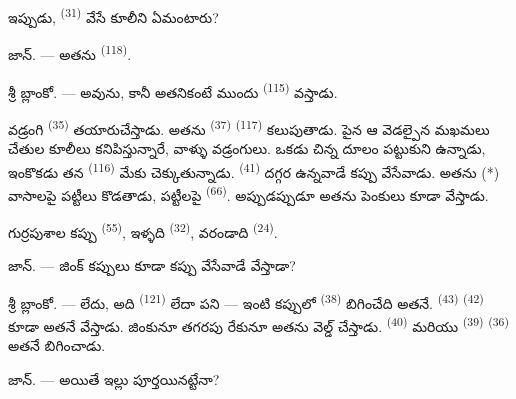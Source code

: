 ఇప్పుడు,  \textsuperscript{(31)} వేసే కూలీని ఏమంటారు?

\textsc{జాన్}. --- అతను  \textsuperscript{(118)}.

\VUsaut{3.0mm}
\VUsaut{3.0mm}

శ్రీ \textsc{బ్లాంకో}. --- అవును, కానీ అతనికంటే ముందు  \textsuperscript{(115)}
వస్తాడు.

వడ్రంగి  \textsuperscript{(35)} తయారుచేస్తాడు. అతను 
\textsuperscript{(37)}  \textsuperscript{(117)} కలుపుతాడు. పైన ఆ వెడల్పైన
మఖమలు చేతుల కూలీలు కనిపిస్తున్నారే, వాళ్ళు వడ్రంగులు. ఒకడు చిన్న దూలం పట్టుకుని ఉన్నాడు,
ఇంకొకడు తన  \textsuperscript{(116)} మేకు చెక్కుతున్నాడు. 
\textsuperscript{(41)} దగ్గర ఉన్నవాడే కప్పు వేసేవాడు. అతను (*) వాసాలపై పట్టీలు కొడతాడు,
పట్టీలపై  \textsuperscript{(66)}. అప్పుడప్పుడూ అతను పెంకులు కూడా
వేస్తాడు.


గుర్రపుశాల కప్పు  \textsuperscript{(55)}, ఇళ్ళది 
\textsuperscript{(32)}, వరండాది  \textsuperscript{(24)}.

\textsc{జాన్}. --- జింక్ కప్పులు కూడా కప్పు వేసేవాడే వేస్తాడా?

శ్రీ \textsc{బ్లాంకో}. --- లేదు, అది  \textsuperscript{(121)} లేదా
 పని — ఇంటి కప్పులో  \textsuperscript{(38)}
బిగించేది అతనే.  \textsuperscript{(43)} 
\textsuperscript{(42)} కూడా అతనే వేస్తాడు. జింకునూ తగరపు రేకునూ అతను వెల్డ్ చేస్తాడు.
 \textsuperscript{(40)} మరియు 
\textsuperscript{(39)}  \textsuperscript{(36)} అతనే బిగించాడు.

\textsc{జాన్}. --- అయితే ఇల్లు పూర్తయినట్టేనా?

